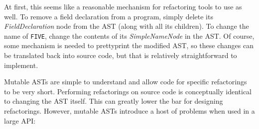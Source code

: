 \documentclass[prodmode]{acmlarge}
\newcommand{\ttt}[1]{\texttt{#1}}
\begin{document}
At first, this seems like a reasonable mechanism for refactoring tools to use
as well.  To remove a field declaration from a program, simply delete its
\textit{FieldDeclaration} node from the AST (along with all its children).  To
change the name of \ttt{FIVE}, change the contents of its
\textit{SimpleNameNode} in the AST.  Of course, some mechanism is needed to
prettyprint the modified AST, so these changes can be translated back into
source code, but that is relatively straightforward to implement.

Mutable ASTs are simple to understand and allow code for specific refactorings
to be very short. Performing refactorings on source code is conceptually
identical to changing the AST itself. This can greatly lower the bar for 
designing refactorings. However, mutable ASTs introduce a host of problems when
used in a large API:
\end{document}
